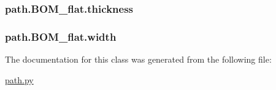\subsubsection[{thickness}]{\setlength{\rightskip}{0pt plus 5cm}path.\+B\+O\+M\+\_\+flat.\+thickness}\label{classpath_1_1_b_o_m__flat_ad81e8b7451c079f0150cfcf6a9a6559a}
\hypertarget{classpath_1_1_b_o_m__flat_a5a6ced1e7078ceb5952279343b0feb1e}{}
\subsubsection[{width}]{\setlength{\rightskip}{0pt plus 5cm}path.\+B\+O\+M\+\_\+flat.\+width}\label{classpath_1_1_b_o_m__flat_a5a6ced1e7078ceb5952279343b0feb1e}


The documentation for this class was generated from the following file\+:\begin{DoxyCompactItemize}
\item 
\hyperlink{path_8py}{path.\+py}\end{DoxyCompactItemize}

